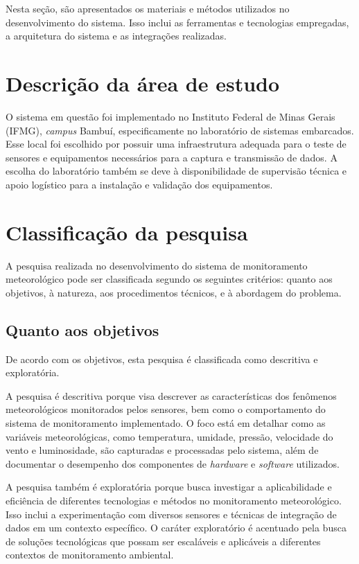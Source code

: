 Nesta seção, são apresentados os materiais e métodos utilizados no desenvolvimento do sistema. Isso inclui as ferramentas e tecnologias empregadas, a arquitetura do sistema e as integrações realizadas.

\section{Descrição da área de estudo}
O sistema em questão foi implementado no Instituto Federal de Minas Gerais (IFMG), \textit{campus} Bambuí, especificamente no laboratório de sistemas embarcados. Esse local foi escolhido por possuir uma infraestrutura adequada para o teste de sensores e equipamentos necessários para a captura e transmissão de dados. A escolha do laboratório também se deve à disponibilidade de supervisão técnica e apoio logístico para a instalação e validação dos equipamentos.

\section{Classificação da pesquisa}

A pesquisa realizada no desenvolvimento do sistema de monitoramento meteorológico pode ser classificada segundo os seguintes critérios: quanto aos objetivos, à natureza, aos procedimentos técnicos, e à abordagem do problema.

\subsection{Quanto aos objetivos}

De acordo com os objetivos, esta pesquisa é classificada como descritiva e exploratória. 

A pesquisa é descritiva porque visa descrever as características dos fenômenos meteorológicos monitorados pelos sensores, bem como o comportamento do sistema de monitoramento implementado. O foco está em detalhar como as variáveis meteorológicas, como temperatura, umidade, pressão, velocidade do vento e luminosidade, são capturadas e processadas pelo sistema, além de documentar o desempenho dos componentes de \textit{hardware} e \textit{software} utilizados.

A pesquisa também é exploratória porque busca investigar a aplicabilidade e eficiência de diferentes tecnologias e métodos no monitoramento meteorológico. Isso inclui a experimentação com diversos sensores e técnicas de integração de dados em um contexto específico. O caráter exploratório é acentuado pela busca de soluções tecnológicas que possam ser escaláveis e aplicáveis a diferentes contextos de monitoramento ambiental.

